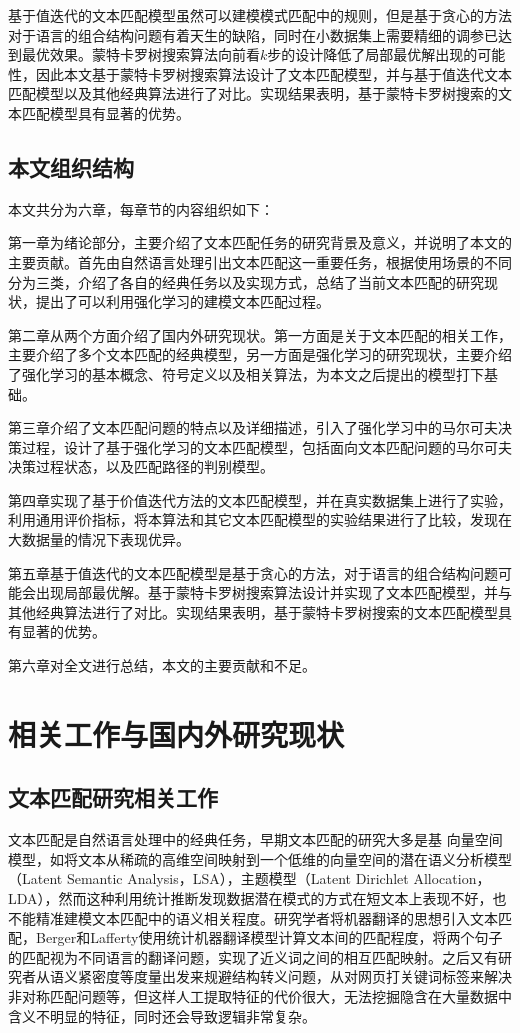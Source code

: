 基于值迭代的文本匹配模型虽然可以建模模式匹配中的规则，但是基于贪心的方法对于语言的组合结构问题有着天生的缺陷，同时在小数据集上需要精细的调参已达到最优效果。蒙特卡罗树搜索算法向前看$k$步的设计降低了局部最优解出现的可能性，因此本文基于蒙特卡罗树搜索算法设计了文本匹配模型，并与基于值迭代文本匹配模型以及其他经典算法进行了对比。实现结果表明，基于蒙特卡罗树搜索的文本匹配模型具有显著的优势。

\section{本文组织结构}
本文共分为六章，每章节的内容组织如下：

第一章为绪论部分，主要介绍了文本匹配任务的研究背景及意义，并说明了本文的主要贡献。首先由自然语言处理引出文本匹配这一重要任务，根据使用场景的不同分为三类，介绍了各自的经典任务以及实现方式，总结了当前文本匹配的研究现状，提出了可以利用强化学习的建模文本匹配过程。

第二章从两个方面介绍了国内外研究现状。第一方面是关于文本匹配的相关工作，主要介绍了多个文本匹配的经典模型，另一方面是强化学习的研究现状，主要介绍了强化学习的基本概念、符号定义以及相关算法，为本文之后提出的模型打下基础。

第三章介绍了文本匹配问题的特点以及详细描述，引入了强化学习中的马尔可夫决策过程，设计了基于强化学习的文本匹配模型，包括面向文本匹配问题的马尔可夫决策过程状态，以及匹配路径的判别模型。

第四章实现了基于价值迭代方法的文本匹配模型，并在真实数据集上进行了实验，利用通用评价指标，将本算法和其它文本匹配模型的实验结果进行了比较，发现在大数据量的情况下表现优异。

第五章基于值迭代的文本匹配模型是基于贪心的方法，对于语言的组合结构问题可能会出现局部最优解。基于蒙特卡罗树搜索算法设计并实现了文本匹配模型，并与其他经典算法进行了对比。实现结果表明，基于蒙特卡罗树搜索的文本匹配模型具有显著的优势。

第六章对全文进行总结，本文的主要贡献和不足。



\chapter{相关工作与国内外研究现状}

\section{文本匹配研究相关工作}
\label{sec:text_matching}
文本匹配是自然语言处理中的经典任务，早期文本匹配的研究大多是基 向量空间模型，如将文本从稀疏的高维空间映射到一个低维的向量空间的潜在语义分析模型\cite{Landauer1998AnIT}（Latent Semantic Analysis，LSA），主题模型\cite{Blei2003LatentDA}（Latent Dirichlet Allocation，LDA），然而这种利用统计推断发现数据潜在模式的方式在短文本上表现不好，也不能精准建模文本匹配中的语义相关程度。研究学者将机器翻译的思想引入文本匹配，Berger和Lafferty使用统计机器翻译模型计算文本间的匹配程度，将两个句子的匹配视为不同语言的翻译问题，实现了近义词之间的相互匹配映射。之后又有研究者从语义紧密度等度量出发来规避结构转义问题，从对网页打关键词标签来解决非对称匹配问题等，但这样人工提取特征的代价很大，无法挖掘隐含在大量数据中含义不明显的特征，同时还会导致逻辑非常复杂。

